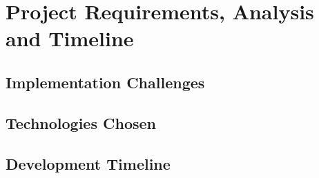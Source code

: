 \chapter{Project Requirements, Analysis and Timeline}

\section{Implementation Challenges}

\section{Technologies Chosen}

\section{Development Timeline}